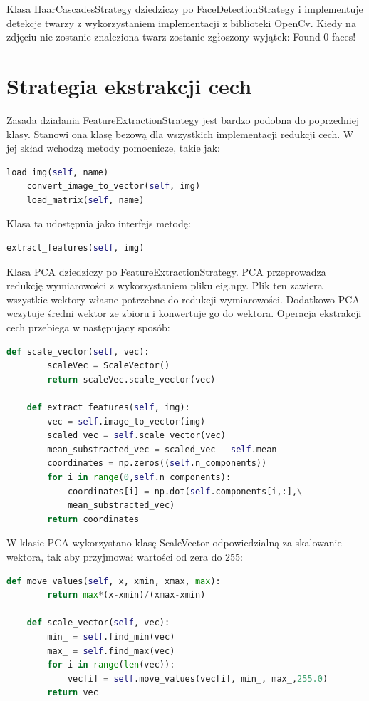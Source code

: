 \documentclass[oneside, eng]{mgr}
\begin{document}
Klasa HaarCascadesStrategy dziedziczy po FaceDetectionStrategy i implementuje detekcje twarzy z wykorzystaniem implementacji z biblioteki OpenCv. Kiedy na zdjęciu nie zostanie znaleziona twarz zostanie zgłoszony wyjątek: Found 0 faces!

\section{Strategia ekstrakcji cech}

Zasada działania FeatureExtractionStrategy jest bardzo podobna do poprzedniej klasy. Stanowi ona klasę bezową dla wszystkich implementacji redukcji cech. W jej skład wchodzą metody pomocnicze, takie jak:

\begin{lstlisting}[language=Python]
	load_img(self, name)
	convert_image_to_vector(self, img)
	load_matrix(self, name)
\end{lstlisting}

Klasa ta udostępnia jako interfejs metodę:

\begin{lstlisting}[language=Python]
    extract_features(self, img)
\end{lstlisting}

Klasa PCA dziedziczy po FeatureExtractionStrategy. PCA przeprowadza redukcję wymiarowości z wykorzystaniem pliku eig.npy. Plik ten zawiera wszystkie wektory własne potrzebne do redukcji wymiarowości. Dodatkowo PCA wczytuje średni wektor ze zbioru i konwertuje go do wektora. Operacja ekstrakcji cech przebiega w następujący sposób:

\begin{lstlisting}[language=Python]
    def scale_vector(self, vec):
        scaleVec = ScaleVector()
        return scaleVec.scale_vector(vec)

    def extract_features(self, img):
        vec = self.image_to_vector(img)
        scaled_vec = self.scale_vector(vec)
        mean_substracted_vec = scaled_vec - self.mean
        coordinates = np.zeros((self.n_components))
        for i in range(0,self.n_components):
            coordinates[i] = np.dot(self.components[i,:],\
            mean_substracted_vec)
        return coordinates
\end{lstlisting}

W klasie PCA wykorzystano klasę ScaleVector odpowiedzialną za skalowanie wektora, tak aby przyjmował wartości od zera do 255:

\begin{lstlisting}[language=Python]
    def move_values(self, x, xmin, xmax, max):
        return max*(x-xmin)/(xmax-xmin)

    def scale_vector(self, vec):
        min_ = self.find_min(vec)
        max_ = self.find_max(vec)
        for i in range(len(vec)):
            vec[i] = self.move_values(vec[i], min_, max_,255.0)
        return vec

\end{lstlisting}
\end{document}
